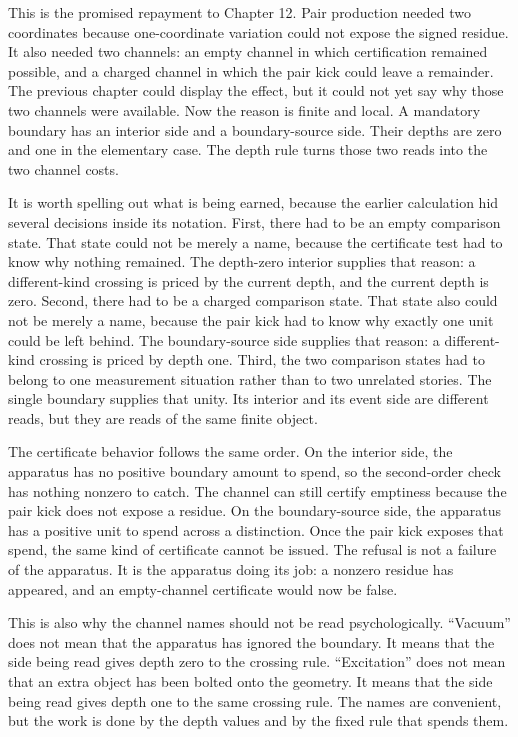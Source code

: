 This is the promised repayment to Chapter 12. Pair production needed two coordinates
because one-coordinate variation could not expose the signed residue. It also needed
two channels: an empty channel in which certification remained possible, and a charged
channel in which the pair kick could leave a remainder. The previous chapter could
display the effect, but it could not yet say why those two channels were available.
Now the reason is finite and local. A mandatory boundary has an interior side and a
boundary-source side. Their depths are zero and one in the elementary case. The depth
rule turns those two reads into the two channel costs.

It is worth spelling out what is being earned, because the earlier calculation hid
several decisions inside its notation. First, there had to be an empty comparison
state. That state could not be merely a name, because the certificate test had to
know why nothing remained. The depth-zero interior supplies that reason: a
different-kind crossing is priced by the current depth, and the current depth is
zero. Second, there had to be a charged comparison state. That state also could not
be merely a name, because the pair kick had to know why exactly one unit could be
left behind. The boundary-source side supplies that reason: a different-kind
crossing is priced by depth one. Third, the two comparison states had to belong to
one measurement situation rather than to two unrelated stories. The single boundary
supplies that unity. Its interior and its event side are different reads, but they
are reads of the same finite object.

The certificate behavior follows the same order. On the interior side, the apparatus
has no positive boundary amount to spend, so the second-order check has nothing
nonzero to catch. The channel can still certify emptiness because the pair kick does
not expose a residue. On the boundary-source side, the apparatus has a positive unit
to spend across a distinction. Once the pair kick exposes that spend, the same kind
of certificate cannot be issued. The refusal is not a failure of the apparatus. It
is the apparatus doing its job: a nonzero residue has appeared, and an empty-channel
certificate would now be false.

This is also why the channel names should not be read psychologically. ``Vacuum''
does not mean that the apparatus has ignored the boundary. It means that the side
being read gives depth zero to the crossing rule. ``Excitation'' does not mean that
an extra object has been bolted onto the geometry. It means that the side being read
gives depth one to the same crossing rule. The names are convenient, but the work is
done by the depth values and by the fixed rule that spends them.

